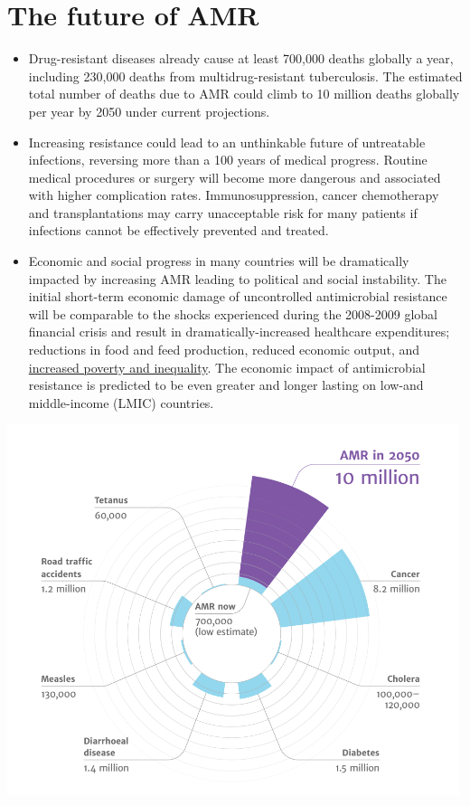 \documentclass[
]{book}
\providecommand{\tightlist}{%
  \setlength{\itemsep}{0pt}\setlength{\parskip}{0pt}}
\begin{document}
\hypertarget{the-future-of-amr}{%
\section*{The future of AMR}\label{the-future-of-amr}}

\begin{itemize}
\tightlist
\item
  Drug-resistant diseases already cause at least 700,000 deaths globally a year, including 230,000 deaths from multidrug-resistant tuberculosis. The estimated total number of deaths due to AMR could climb to 10 million deaths globally per year by 2050 under current projections.
\item
  Increasing resistance could lead to an unthinkable future of untreatable infections, reversing more than a 100 years of medical progress. Routine medical procedures or surgery will become more dangerous and associated with higher complication rates. Immunosuppression, cancer chemotherapy and transplantations may carry unacceptable risk for many patients if infections cannot be effectively prevented and treated.
\item
  Economic and social progress in many countries will be dramatically impacted by increasing AMR leading to political and social instability. The initial short-term economic damage of uncontrolled antimicrobial resistance will be comparable to the shocks experienced during the 2008-2009 global financial crisis and result in dramatically-increased healthcare expenditures; reductions in food and feed production, reduced economic output, and \href{https://documents.worldbank.org/en/publication/documents-reports/documentdetail/323311493396993758/final-report}{increased poverty and inequality}. The economic impact of antimicrobial resistance is predicted to be even greater and longer lasting on low-and middle-income (LMIC) countries.
\end{itemize}

\includegraphics[width=5.20833in,height=\textheight]{images/AMR_deaths_2050.png}
\end{document}
